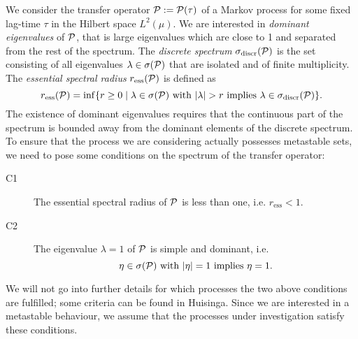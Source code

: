 We consider the transfer operator $\mathcal{P} := \mathcal{P}(\tau)$ of a Markov process for some fixed lag-time $\tau$ in the Hilbert space $L^2(\mu)$. 
We are interested in \textit{dominant eigenvalues} of $\mathcal{P}$, that is large eigenvalues which are close to 1 and separated from the rest of the spectrum.
The \textit{discrete spectrum} $\sigma_{\mathrm{discr}}(\mathcal{P})$ is the set consisting of all eigenvalues $\lambda \in \sigma(\mathcal{P})$ that are isolated and of finite multiplicity.
The \textit{essential spectral radius} $r_{\mathrm{ess}}(\mathcal{P})$ is defined as
\begin{equation*}
r_{\mathrm{ess}}(\mathcal{P}) = \inf \{ r \geq 0 \mid \lambda \in \sigma(\mathcal{P}) \textrm{ with } |\lambda| > r \textrm{ implies } \lambda \in \sigma_{\mathrm{discr}}(\mathcal{P}) \}.
\end{equation*}
The existence of dominant eigenvalues requires that the continuous part of the spectrum is bounded away from the dominant elements of the discrete spectrum.
To ensure that the process we are considering actually possesses metastable sets, we need to pose some conditions on the spectrum of the transfer operator:
\begin{description}
    \item[C1] The essential spectral radius of $\mathcal{P}$ is less than one, i.e. $r_{\mathrm{ess}} < 1$.
    \item[C2] The eigenvalue $\lambda=1$ of $\mathcal{P}$ is simple and dominant, i.e.
    \begin{equation*}
    \eta \in \sigma(\mathcal{P}) \textrm{ with } |\eta| = 1 \textrm{ implies } \eta = 1.
    \end{equation*}
\end{description}
We will not go into further details for which processes the two above conditions are fulfilled; some criteria can be found in Huisinga\cite[chapter $4$]{huisinga2001metastability}.
Since we are interested in a metastable behaviour, we assume that the processes under investigation satisfy these conditions.
